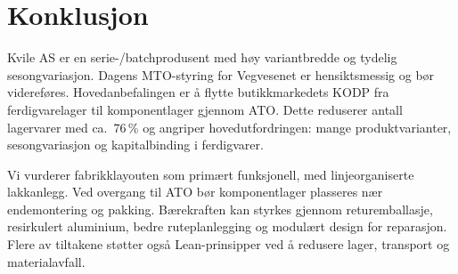 \section*{Konklusjon}

Kvile AS er en serie-/batchprodusent med høy variantbredde og tydelig sesongvariasjon. Dagens MTO-styring for Vegvesenet er hensiktsmessig og bør videreføres. Hovedanbefalingen er å flytte butikkmarkedets KODP fra ferdigvarelager til komponentlager gjennom ATO. Dette reduserer antall lagervarer med ca.\ 76\,\% og angriper hovedutfordringen: mange produktvarianter, sesongvariasjon og kapitalbinding i ferdigvarer.

Vi vurderer fabrikklayouten som primært funksjonell, med linjeorganiserte lakkanlegg. Ved overgang til ATO bør komponentlager plasseres nær endemontering og pakking. Bærekraften kan styrkes gjennom returemballasje, resirkulert aluminium, bedre ruteplanlegging og modulært design for reparasjon. Flere av tiltakene støtter også Lean-prinsipper ved å redusere lager, transport og materialavfall.
